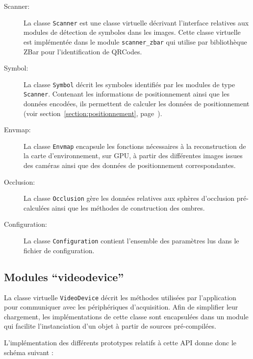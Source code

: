 \documentclass[10pt,a4paper,twoside, twocolumn]{report}
\begin{document}
\begin{description}
	\item[Scanner:] La classe \texttt{Scanner} est une classe virtuelle décrivant l’interface relatives aux modules de détection de symboles dans les images. Cette classe virtuelle est implémentée dans le module \texttt{scanner\_zbar} qui utilise par bibliothèque ZBar pour l’identification de QRCodes.
	\item[Symbol:] La classe \texttt{Symbol} décrit les symboles identifiés par les modules de type \texttt{Scanner}. Contenant les informations de positionnement ainsi que les données encodées, ils permettent de calculer les données de positionnement (voir section~\ref{section:positionnement}, page~\pageref{section:positionnement}).

	\item[Envmap:] La classe \texttt{Envmap} encapsule les fonctions nécessaires à la reconstruction de la carte d’environnement, sur GPU, à partir des différentes images issues des caméras ainsi que des données de positionnement correspondantes.

	\item[Occlusion:] La classe \texttt{Occlusion} gère les données relatives aux sphères d’occlusion pré-calculées ainsi que les méthodes de construction des ombres.

	\item[Configuration:] La classe \texttt{Configuration} contient l’ensemble des paramètres lus dans le fichier de configuration.
\end{description}



\subsection{Modules “videodevice”}

La classe virtuelle \texttt{VideoDevice} décrit les méthodes utilisées par l’application pour communiquer avec les périphériques d’acquisition. Afin de simplifier leur chargement, les implémentations de cette classe sont encapsulées dans un module qui facilite l’instanciation d’un objet à partir de sources pré-compilées.

L’implémentation des différents prototypes relatifs à cette API donne donc le schéma suivant :
\end{document}
